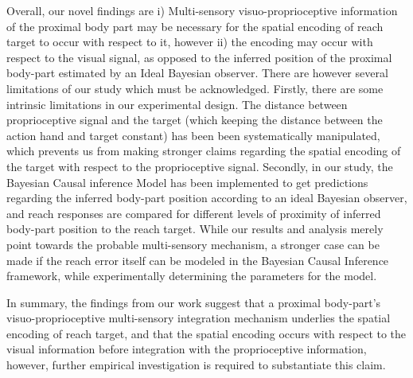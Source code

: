Overall, our novel findings are i) Multi-sensory visuo-proprioceptive information of the proximal body part may be necessary for the spatial encoding of reach target to occur with respect to it, however ii) the encoding may occur with respect to the visual signal, as opposed to the inferred position of the proximal body-part estimated by an Ideal Bayesian observer. There are however several limitations of our study which must be acknowledged. Firstly, there are some intrinsic limitations in our experimental design. The distance between proprioceptive signal and the target (which keeping the distance between the action hand and target constant) has been been systematically manipulated, which prevents us from making stronger claims regarding the spatial encoding of the target with respect to the proprioceptive signal. Secondly, in our study, the Bayesian Causal inference Model has been implemented to get predictions regarding the inferred body-part position according to an ideal Bayesian observer, and reach responses are compared for different levels of proximity of inferred body-part position to the reach target. While our results and analysis merely point towards the probable multi-sensory mechanism, a stronger case can be made if the reach error itself can be modeled in the Bayesian Causal Inference framework, while experimentally determining the parameters for the model. 

In summary, the findings from our work suggest that a proximal body-part's visuo-proprioceptive multi-sensory integration mechanism underlies the spatial encoding of reach target, and that the spatial encoding occurs with respect to the visual information before integration with the proprioceptive information, however, further empirical investigation is required to substantiate this  claim.







